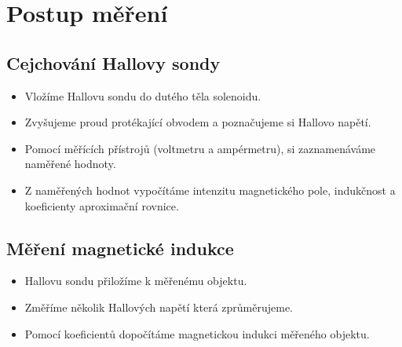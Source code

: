 \section{Postup měření}
  \subsection{Cejchování Hallovy sondy}
    \begin{itemize}
      \item
        Vložíme Hallovu sondu do dutého těla solenoidu.
      \item
      	Zvyšujeme proud protékající obvodem a poznačujeme si Hallovo napětí.
      \item
        Pomocí měřících přístrojů (voltmetru a ampérmetru), si zaznamenáváme naměřené hodnoty.  
      \item
        Z naměřených hodnot vypočítáme intenzitu magnetického pole, indukčnost a koeficienty aproximační rovnice.
		\end{itemize}
		
	\subsection{Měření magnetické indukce}
    \begin{itemize}
      \item
        Hallovu sondu přiložíme k měřenému objektu.
      \item
      	Změříme několik Hallových napětí která zprůměrujeme.
      \item
      	Pomocí koeficientů dopočítáme magnetickou indukci měřeného objektu.
		\end{itemize}
